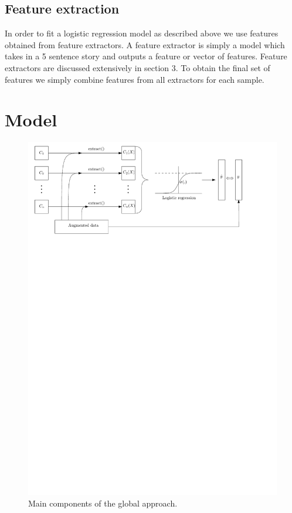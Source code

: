 \documentclass{article}
\begin{document}
\subsection{Feature extraction}
In order to fit a logistic regression model as described above we use features obtained from feature extractors. A feature extractor is simply a model which takes in a 5 sentence story and outputs a feature or vector of features. Feature extractors are discussed extensively in section 3. To obtain the final set of features we simply combine features from all extractors for each sample.

\section{Model}

	\begin{figure}[h!]
		\centering
		\includegraphics[scale=0.8]{fig/logistic_fitting.pdf}
		\caption{Main components of the global approach.}
		\label{Main}
	\end{figure}
\end{document}
